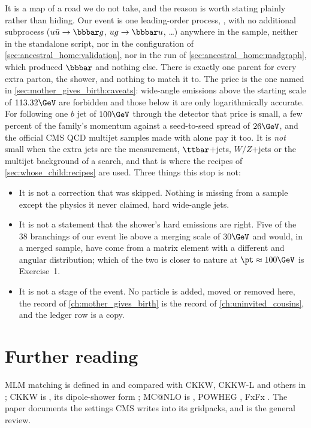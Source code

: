 It is a map of a road we do not take, and the reason is worth stating
plainly rather than hiding. Our event is one leading-order process,
, with no additional subprocess
($u\bar u\to\bbbar g$, $ug\to\bbbar u$, \dots) anywhere in the sample, neither
in the standalone script, nor in the \CMSSW configuration of
\cref{sec:ancestral_home:validation}, nor in the \MG run of
\cref{sec:ancestral_home:madgraph}, which produced $\bbbar$ and nothing
else. There is exactly one parent for every extra parton, the shower, and
nothing to match it to. The price is the one named in
\cref{sec:mother_gives_birth:caveats}: wide-angle emissions above the
starting scale of $113.32\GeV$ are forbidden and those below it are only
logarithmically accurate. For following one $b$ jet of $100\GeV$ through
the detector that price is small, a few percent of the family's momentum
against a seed-to-seed spread of $26\GeV$, and the official CMS QCD
multijet samples made with \PYTHIA alone pay it too. It is \emph{not} small
when the extra jets are the measurement, $\ttbar$+jets, $W/Z$+jets or the
multijet background of a search, and that is where the recipes of
\cref{sec:whose_child:recipes} are used. Three things this stop is not:
\begin{itemize}[nosep]
  \item It is not a correction that was skipped. Nothing is missing from a
     sample except the physics it never claimed, hard
    wide-angle jets.
  \item It is not a statement that the shower's hard emissions are right.
    Five of the $38$ branchings of our event lie above a merging scale of
    $30\GeV$ and would, in a merged sample, have come from a matrix element
    with a different \pt and angular distribution; which of the two is
    closer to nature at $\pt\approx100\GeV$ is Exercise~1.
  \item It is not a stage of the event. No particle is added, moved or
    removed here, the record of \cref{ch:mother_gives_birth} is the record
    of \cref{ch:uninvited_cousins}, and the ledger row is a copy.
\end{itemize}

\section{Further reading}
\label{sec:whose_child:further_reading}
MLM matching is defined in \cite{Mangano:2006rw} and compared with CKKW,
CKKW-L and others in \cite{Alwall:2007fs}; CKKW is \cite{Catani:2001cc},
its dipole-shower form \cite{Lonnblad:2001iq,Lonnblad:2011xx}; MC@NLO is
\cite{Frixione:2002ik}, POWHEG \cite{Nason:2004rx,Frixione:2007vw}, FxFx
\cite{Frederix:2012ps}. The \MG paper \cite{Alwall:2014hca} documents the
settings CMS writes into its gridpacks, and \cite{Buckley:2011ms} is the
general review.

